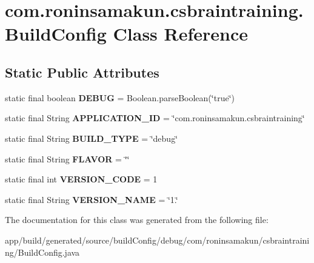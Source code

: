 \section{com.\+roninsamakun.\+csbraintraining.\+Build\+Config Class Reference}
\label{classcom_1_1roninsamakun_1_1csbraintraining_1_1_build_config}
\subsection*{Static Public Attributes}
\begin{DoxyCompactItemize}
\item 
static final boolean {\bfseries D\+E\+B\+U\+G} = Boolean.\+parse\+Boolean(\char`\"{}true\char`\"{})\label{classcom_1_1roninsamakun_1_1csbraintraining_1_1_build_config_a7b0e65ff984f81fb7931b4dab8823979}

\item 
static final String {\bfseries A\+P\+P\+L\+I\+C\+A\+T\+I\+O\+N\+\_\+\+I\+D} = \char`\"{}com.\+roninsamakun.\+csbraintraining\char`\"{}\label{classcom_1_1roninsamakun_1_1csbraintraining_1_1_build_config_a84ec27774c56052b68507507ba7048e1}

\item 
static final String {\bfseries B\+U\+I\+L\+D\+\_\+\+T\+Y\+P\+E} = \char`\"{}debug\char`\"{}\label{classcom_1_1roninsamakun_1_1csbraintraining_1_1_build_config_af146b37c3497121c112c15e93f06c0de}

\item 
static final String {\bfseries F\+L\+A\+V\+O\+R} = \char`\"{}\char`\"{}\label{classcom_1_1roninsamakun_1_1csbraintraining_1_1_build_config_acc5d9b56649a1d2ca12cb4c99e55dc30}

\item 
static final int {\bfseries V\+E\+R\+S\+I\+O\+N\+\_\+\+C\+O\+D\+E} = 1\label{classcom_1_1roninsamakun_1_1csbraintraining_1_1_build_config_adb617e48b37824130e1c203c08df5b88}

\item 
static final String {\bfseries V\+E\+R\+S\+I\+O\+N\+\_\+\+N\+A\+M\+E} = \char`\"{}1.\char`\"{}\label{classcom_1_1roninsamakun_1_1csbraintraining_1_1_build_config_a9a9287773072002ee7b5cc69fbd56537}

\end{DoxyCompactItemize}


The documentation for this class was generated from the following file\+:\begin{DoxyCompactItemize}
\item 
app/build/generated/source/build\+Config/debug/com/roninsamakun/csbraintraining/Build\+Config.\+java\end{DoxyCompactItemize}
